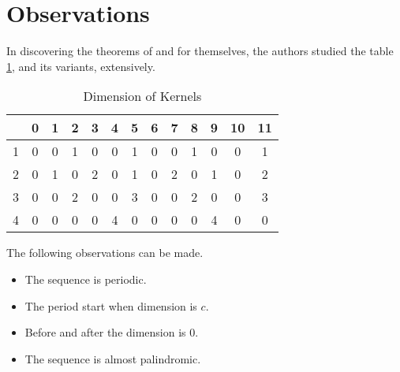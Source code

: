 \section{Observations}
In discovering the theorems of \cite{martin01} and \cite{leach17} for
themselves, the authors studied the table \ref{kernels}, and its variants, extensively.

\begin{table}
  \caption{Dimension of Kernels}\label{kernels}
  \begin{tabular}{|c|cccccccccccc|}
    \hline
    & \phantom{0}0 & \phantom{0}1 & \phantom{0}2 & \phantom{0}3 & \phantom{0}4 & \phantom{0}5 & \phantom{0}6 & \phantom{0}7 & \phantom{0}8 & \phantom{0}9 & 10 & 11 \\
    \hline
    \hline
    1 & 0 & 0 & 1 & 0 & 0 & 1 & 0 & 0 & 1 & 0 & 0 & 1 \\
    2 & 0 & 1 & 0 & 2 & 0 & 1 & 0 & 2 & 0 & 1 & 0 & 2 \\
    3 & 0 & 0 & 2 & 0 & 0 & 3 & 0 & 0 & 2 & 0 & 0 & 3 \\
    4 & 0 & 0 & 0 & 0 & 4 & 0 & 0 & 0 & 0 & 4 & 0 & 0 \\
    \hline
  \end{tabular}
\end{table}

The following observations can be made.

\begin{itemize}
\item The sequence is periodic.
\item The period start when dimension is $c$.
\item Before and after the dimension is $0$.
\item The sequence is almost palindromic.
\end{itemize}


